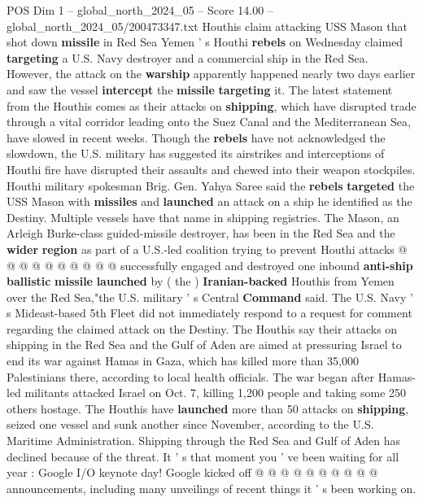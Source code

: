 \begin{textsample}{POS Dim 1 – global\_north\_2024\_05 – Score 14.00 – global\_north\_2024\_05/200473347.txt}  \label{ex:f1_pos_407}
Houthis claim attacking USS Mason that shot down \textbf{missile} in Red Sea Yemen ' s Houthi \textbf{rebels} on Wednesday claimed \textbf{targeting} a U.S.
Navy destroyer and a commercial ship in the Red Sea.
However, the attack on the \textbf{warship} apparently happened nearly two days earlier and saw the vessel \textbf{intercept} the \textbf{missile} \textbf{targeting} it.
The latest statement from the Houthis comes as their attacks on \textbf{shipping}, which have disrupted trade through a vital corridor leading onto the Suez Canal and the Mediterranean Sea, have slowed in recent weeks.
Though the \textbf{rebels} have not acknowledged the slowdown, the U.S. military has suggested its airstrikes and interceptions of Houthi fire have disrupted their assaults and chewed into their weapon stockpiles.
Houthi military spokesman Brig.
Gen.
Yahya Saree said the \textbf{rebels} \textbf{targeted} the USS Mason with \textbf{missiles} and \textbf{launched} an attack on a ship he identified as the Destiny.
Multiple vessels have that name in shipping registries.
The Mason, an Arleigh Burke-class guided-missile destroyer, has been in the Red Sea and the \textbf{wider} \textbf{region} as part of a U.S.-led coalition trying to prevent Houthi attacks @ @ @ @ @ @ @ @ @ @ successfully engaged and destroyed one inbound \textbf{anti-ship} \textbf{ballistic} \textbf{missile} \textbf{launched} by ( the ) \textbf{Iranian-backed} Houthis from Yemen over the Red Sea,"the U.S. military ' s Central \textbf{Command} said.
The U.S.
Navy ' s Mideast-based 5th Fleet did not immediately respond to a request for comment regarding the claimed attack on the Destiny.
The Houthis say their attacks on shipping in the Red Sea and the Gulf of Aden are aimed at pressuring Israel to end its war against Hamas in Gaza, which has killed more than 35,000 Palestinians there, according to local health officials.
The war began after Hamas-led militants attacked Israel on Oct. 7, killing 1,200 people and taking some 250 others hostage.
The Houthis have \textbf{launched} more than 50 attacks on \textbf{shipping}, seized one vessel and sunk another since November, according to the U.S.
Maritime Administration.
Shipping through the Red Sea and Gulf of Aden has declined because of the threat.
It ' s that moment you ' ve been waiting for all year : Google I/O keynote day!
Google kicked off @ @ @ @ @ @ @ @ @ @ announcements, including many unveilings of recent things it ' s been working on.

\end{textsample}
